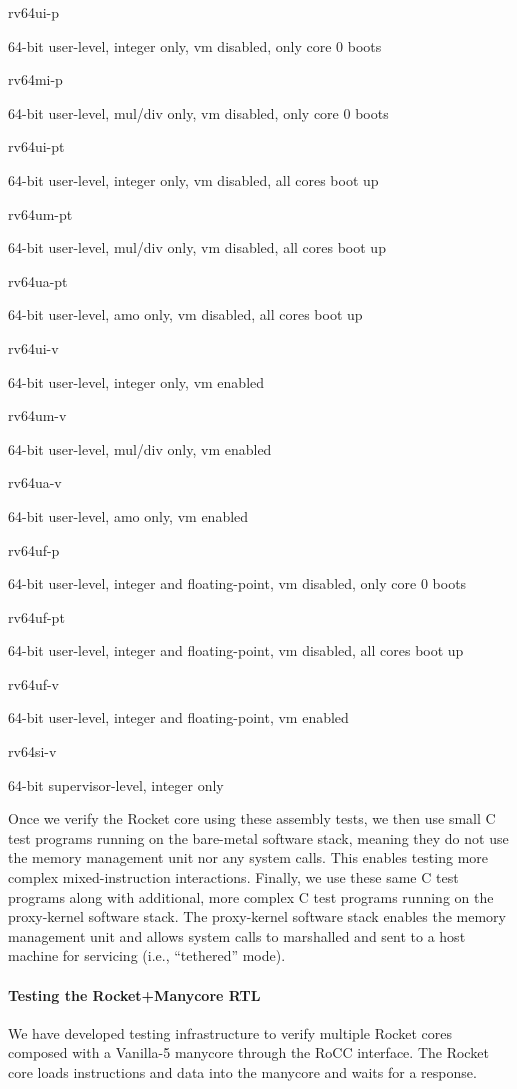\smallskip
\begin{cbxlist}{1.5em}{0em}{0em}
  \item \parbox{0.7in}{rv64ui-p}  64-bit user-level, integer only, vm disabled, only core 0 boots
  \item \parbox{0.7in}{rv64mi-p}  64-bit user-level, mul/div only, vm disabled, only core 0 boots
  \item \parbox{0.7in}{rv64ui-pt} 64-bit user-level, integer only, vm disabled, all cores boot up
  \item \parbox{0.7in}{rv64um-pt} 64-bit user-level, mul/div only, vm disabled, all cores boot up
  \item \parbox{0.7in}{rv64ua-pt} 64-bit user-level, amo only, vm disabled, all cores boot up
  \item \parbox{0.7in}{rv64ui-v}  64-bit user-level, integer only, vm enabled
  \item \parbox{0.7in}{rv64um-v}  64-bit user-level, mul/div only, vm enabled
  \item \parbox{0.7in}{rv64ua-v}  64-bit user-level, amo only, vm enabled
  \item \parbox{0.7in}{rv64uf-p}  64-bit user-level, integer and floating-point, vm disabled, only core 0 boots
  \item \parbox{0.7in}{rv64uf-pt} 64-bit user-level, integer and floating-point, vm disabled, all cores boot up
  \item \parbox{0.7in}{rv64uf-v}  64-bit user-level, integer and floating-point, vm enabled
  \item \parbox{0.7in}{rv64si-v}  64-bit supervisor-level, integer only
\end{cbxlist}
\smallskip

Once we verify the Rocket core using these assembly tests, we then use
small C test programs running on the bare-metal software stack, meaning
they do not use the memory management unit nor any system calls. This
enables testing more complex mixed-instruction interactions. Finally, we
use these same C test programs along with additional, more complex C test
programs running on the proxy-kernel software stack. The proxy-kernel
software stack enables the memory management unit and allows system calls
to marshalled and sent to a host machine for servicing (i.e.,
``tethered'' mode).

\paragraph{Testing the Rocket+Manycore RTL}
We have developed testing infrastructure to verify multiple Rocket cores
composed with a Vanilla-5 manycore through the RoCC interface. The Rocket
core loads instructions and data into the manycore and waits for a
response.

